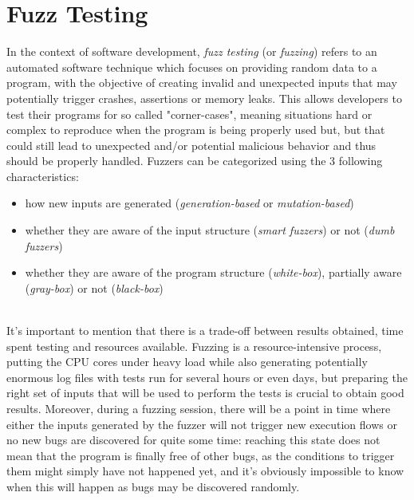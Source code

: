 \newpage
\section{Fuzz Testing}
In the context of software development, \textit{fuzz testing} (or \textit{fuzzing}) refers to an automated software technique which focuses on providing random data to a program, with the objective of creating invalid and unexpected inputs that may potentially trigger crashes, assertions or memory leaks.
\newline 
This allows developers to test their programs for so called "corner-cases", meaning situations hard or complex to reproduce when the program is being properly used but, but that could still lead to unexpected and/or potential malicious behavior and thus should be properly handled. 
\newline \newline
Fuzzers can be categorized using the 3 following characteristics:
\begin{itemize}
    \item how new inputs are generated (\textit{generation-based} or \textit{mutation-based})
    \item whether they are aware of the input structure (\textit{smart fuzzers}) or not (\textit{dumb fuzzers})
    \item whether they are aware of the program structure (\textit{white-box}), partially aware (\textit{gray-box}) or not (\textit{black-box})
\end{itemize}
\ \\
It's important to mention that there is a trade-off between results obtained, time spent testing and resources available.
\newline
Fuzzing is a resource-intensive process, putting the CPU cores under heavy load while also generating potentially enormous log files with tests run for several hours or even days, but preparing the right set of inputs that will be used to perform the tests is crucial to obtain good results.
\newline
Moreover, during a fuzzing session, there will be a point in time where either the inputs generated by the fuzzer will not trigger new execution flows or no new bugs are discovered for quite some time: reaching this state does not mean that the program is finally free of other bugs, as the conditions to trigger them might simply have not happened yet, and it's obviously impossible to know when this will happen as bugs may be discovered randomly.
\newline \newline \newline
